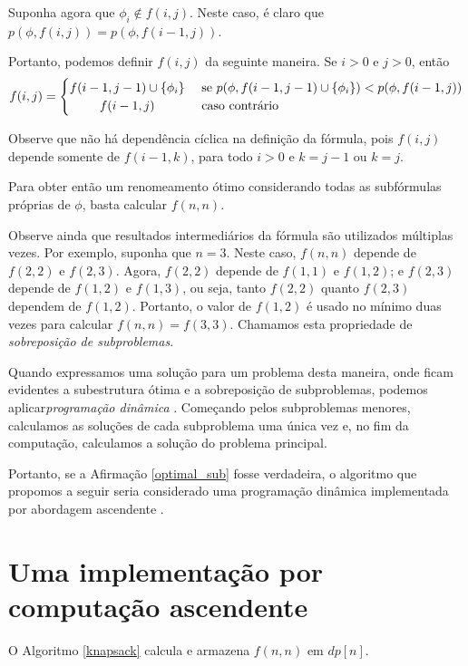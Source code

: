 Suponha agora que $\phi_i \notin f(i,j)$. Neste caso, é claro que $p(\phi,f(i,j)) = p(\phi,f(i-1,j))$.

Portanto, podemos definir $f(i,j)$ da seguinte maneira. Se $i > 0$ e $j > 0$, então
\[
f(i,j) =
\begin{cases} 
\hfill f(i-1,j-1) \cup \{\phi_i \}   \hfill & \text{ se } p(\phi,f(i-1,j-1) \cup \{\phi_i \}) < p(\phi,f(i-1,j)) \\
\hfill f(i-1,j) \hfill & \text{ caso contrário} \\
\end{cases}
\]

Observe que não há dependência cíclica na definição da fórmula, pois $f(i,j)$ depende somente de $f(i-1,k)$, para todo $i > 0$ e $k=j-1$ ou $k=j$.

Para obter então um renomeamento ótimo considerando todas as subfórmulas próprias de $\phi$, basta calcular $f(n,n)$.

Observe ainda que resultados intermediários da fórmula são utilizados múltiplas vezes. Por exemplo, suponha que $n = 3$. Neste caso, $f(n,n)$ depende de $f(2,2)$ e $f(2,3)$. Agora, $f(2,2)$ depende de $f(1,1)$ e $f(1,2)$; e $f(2,3)$ depende de $f(1,2)$ e $f(1,3)$, ou seja, tanto $f(2,2)$ quanto $f(2,3)$ dependem de $f(1,2)$. Portanto, o valor de $f(1,2)$ é usado no mínimo duas vezes para calcular $f(n,n) = f(3,3)$. Chamamos esta propriedade de \emph{sobreposição de subproblemas}.

Quando expressamos uma solução para um problema desta maneira, onde ficam evidentes a subestrutura ótima e a sobreposição de subproblemas, podemos aplicar\break \emph{programação dinâmica} \cite{bellman2015applied}. Começando pelos subproblemas menores, calculamos as soluções de cada subproblema uma única vez e, no fim da computação, calculamos a solução do problema principal.

Portanto, se a Afirmação \ref{optimal_sub} fosse verdadeira, o algoritmo que propomos a seguir seria considerado uma programação dinâmica implementada por abordagem ascendente \cite{bellman2015applied}.

\section{Uma implementação por computação ascendente}
\label{algoritmo_bottom_up}

\indent

O Algoritmo \ref{knapsack} calcula e armazena $f(n,n)$ em $dp[n]$.

